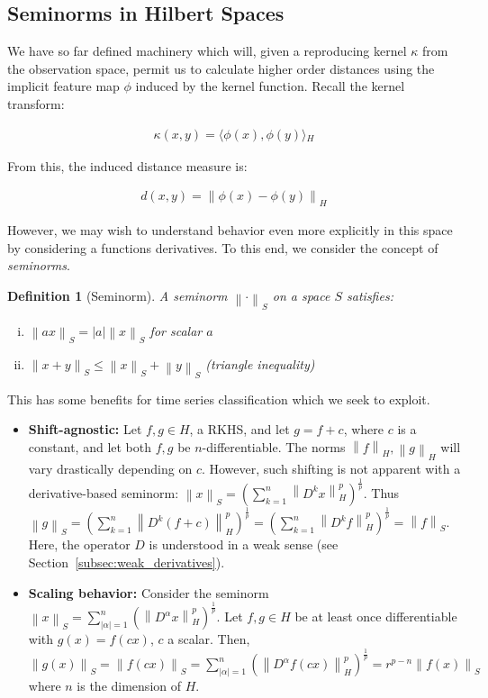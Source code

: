 \documentclass[a4paper]{article}
\newcommand{\norm}[1]{\left\lVert#1\right\rVert}
\newcommand{\innerproduct}[2]{\langle{}#1,#2\rangle{}}
\theoremstyle{def}
\newtheorem{definition}{Definition}
\theoremstyle{thm}
\begin{document}
\subsection{Seminorms in Hilbert Spaces}
\label{subsec:seminorms}

We have so far defined machinery which will, given a reproducing kernel $\kappa$ from the observation space, permit us to calculate higher order distances using the implicit feature map $\phi$ induced by the kernel function.
Recall the kernel transform:

\begin{align}
    \kappa(x,y) = \innerproduct{\phi(x)}{\phi(y)}_H
\end{align}

From this, the induced distance measure is:

\begin{align}
    d(x,y) = \norm{\phi(x) - \phi(y)}_H
\end{align}

However, we may wish to understand behavior even more explicitly in this space by considering a functions derivatives.
To this end, we consider the concept of \textit{seminorms}.

\begin{definition}[Seminorm]
    A seminorm $\norm{\cdot}_S$ on a space $S$ satisfies:
    \begin{enumerate}[(i)]
        \item $\norm{ax}_S = |a|\norm{x}_S$ for scalar $a$
        \item $\norm{x + y}_S \le \norm{x}_S + \norm{y}_S$ (triangle inequality)
    \end{enumerate}
\end{definition}

This has some benefits for time series classification which we seek to exploit.
\begin{itemize}
    \item \textbf{Shift-agnostic:} Let $f,g \in H$, a RKHS, and let $g = f + c$, where $c$ is a constant, and let both $f,g$ be $n$-differentiable.
        The norms $\norm{f}_H, \norm{g}_H$ will vary drastically depending on $c$.
        However, such shifting is not apparent with a derivative-based seminorm: $\norm{x}_S = {(\sum\limits_{k=1}^n \norm{D^k x}^p_H)}^{\frac{1}{p}}$.
        Thus $\norm{g}_S = {(\sum\limits_{k=1}^n \norm{D^k (f+c)}^p_H)}^{\frac{1}{p}} = {(\sum\limits_{k=1}^n \norm{D^k f}^p_H)}^{\frac{1}{p}} = \norm{f}_S$.
        Here, the operator $D$ is understood in a weak sense (see Section~\ref{subsec:weak_derivatives}).
    \item \textbf{Scaling behavior:} Consider the seminorm $\norm{x}_S = {\sum\limits_{|\alpha| = 1}^n(\norm{D^{\alpha} x}^p_H)}^{\frac{1}{p}}$.
        Let $f,g \in H$ be at least once differentiable with $g(x) = f(cx)$, $c$ a scalar.
        Then, $\norm{g(x)}_S = \norm{f(cx)}_S = {\sum\limits_{|\alpha| = 1}^n(\norm{D^{\alpha} f(cx)}^p_H)}^{\frac{1}{p}} = r^{p-n} \norm{f(x)}_S$ where $n$ is the dimension of $H$.
\end{itemize}
\end{document}
